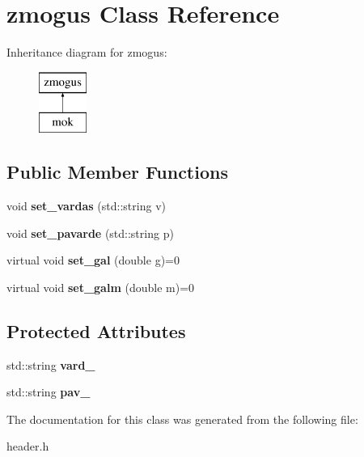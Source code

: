 \hypertarget{classzmogus}{}\section{zmogus Class Reference}
\label{classzmogus}
Inheritance diagram for zmogus\+:\begin{figure}[H]
\begin{center}
\leavevmode
\includegraphics[height=2.000000cm]{classzmogus}
\end{center}
\end{figure}
\subsection*{Public Member Functions}
\begin{DoxyCompactItemize}
\item 
\mbox{\label{classzmogus_a2347dacd0d2d2a1b1ae0598f504760da}} 
void {\bfseries set\+\_\+vardas} (std\+::string v)
\item 
\mbox{\label{classzmogus_a240c7775af8e7d10c10789009b81d60b}} 
void {\bfseries set\+\_\+pavarde} (std\+::string p)
\item 
\mbox{\label{classzmogus_a974bf520bc838d8e7d126db43da54a7e}} 
virtual void {\bfseries set\+\_\+gal} (double g)=0
\item 
\mbox{\label{classzmogus_a8e447945e5859f7e2b1ec5dffbe0860d}} 
virtual void {\bfseries set\+\_\+galm} (double m)=0
\end{DoxyCompactItemize}
\subsection*{Protected Attributes}
\begin{DoxyCompactItemize}
\item 
\mbox{\label{classzmogus_aee27efad7c27746f8157a7a52684605b}} 
std\+::string {\bfseries vard\+\_\+}
\item 
\mbox{\label{classzmogus_a9bd289749516bcc4ea7e50d92575d07c}} 
std\+::string {\bfseries pav\+\_\+}
\end{DoxyCompactItemize}


The documentation for this class was generated from the following file\+:\begin{DoxyCompactItemize}
\item 
header.\+h\end{DoxyCompactItemize}
